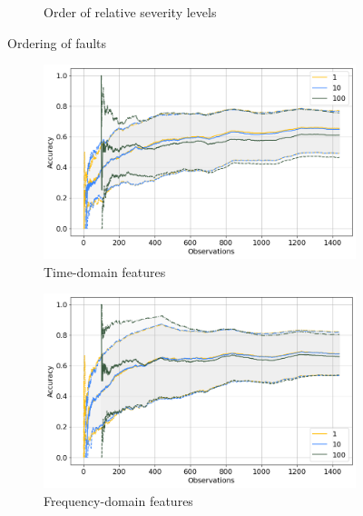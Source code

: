 \begin{figure}[ht]
\begin{subfigure}[b]{0.3\textwidth}
        \caption{Order of relative severity levels}
    \end{subfigure}
    \caption{Ordering of faults}
\end{figure}


\begin{figure}[h]
    \centering
    \begin{subfigure}[b]{0.48\textwidth}
        \includegraphics[width=\textwidth]{assets/results/incremental-learning/tumbling-TD.png}
        \caption{Time-domain features}
    \end{subfigure}
    \hfill
    \begin{subfigure}[b]{0.48\textwidth}
        \includegraphics[width=\textwidth]{assets/results/incremental-learning/tumbling-FD.png}
        \caption{Frequency-domain features}
    \end{subfigure}
    \hfill
    \begin{subfigure}[b]{0.48\textwidth}

\end{subfigure}
\end{figure}

